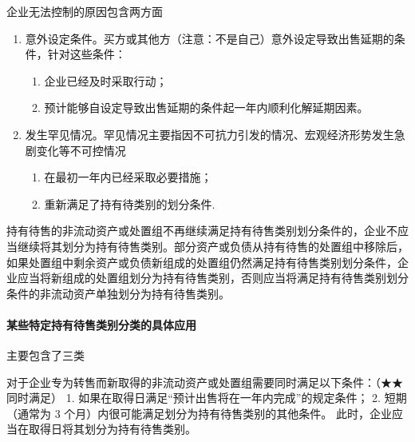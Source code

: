 \documentclass[UTF8,12pt]{ctexart}
\numberwithin{equation}{section} %
\numberwithin{figure}{section}
\numberwithin{table}{section}
\begin{document}
	企业无法控制的原因包含两方面
	\begin{enumerate}
		\item 意外设定条件。买方或其他方（注意：不是自己）意外设定导致出售延期的条件，针对这些条件：
		\begin{enumerate}
			\item 企业已经及时采取行动；

			\item 预计能够自设定导致出售延期的条件起一年内顺利化解延期因素。
		\end{enumerate}
		
		\item 发生罕见情况。罕见情况主要指因不可抗力引发的情况、宏观经济形势发生急剧变化等不可控情况
		\begin{enumerate}
			\item 在最初一年内已经采取必要措施；
			
			\item 重新满足了持有待类别的划分条件.
		\end{enumerate}
	\end{enumerate}

	持有待售的非流动资产或处置组不再继续满足持有待售类别划分条件的，企业不应当继续将其划分为持有待售类别。部分资产或负债从持有待售的处置组中移除后，如果处置组中剩余资产或负债新组成的处置组仍然满足持有待售类别划分条件，企业应当将新组成的处置组划分为持有待售类别，否则应当将满足持有待售类别划分条件的非流动资产单独划分为持有待售类别。
	
	\paragraph{某些特定持有待售类别分类的具体应用}
	主要包含了三类
	
	对于企业专为转售而新取得的非流动资产或处置组需要同时满足以下条件：（★★同时满足）
	1.	如果在取得日满足“预计出售将在一年内完成”的规定条件；
	2.	短期（通常为 3 个月）内很可能满足划分为持有待售类别的其他条件。
	此时，企业应当在取得日将其划分为持有待售类别。
	
\end{document}
